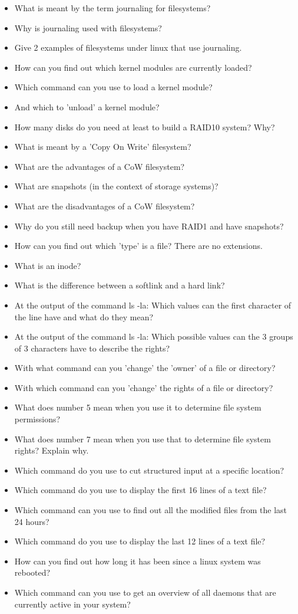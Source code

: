 \documentclass{article}
\begin{document}
\begin{itemize}
    \item What is meant by the term journaling for filesystems?
    \item Why is journaling used with filesystems?
    \item Give 2 examples of filesystems under linux that use journaling.
    \item How can you find out which kernel modules are currently loaded?
    \item Which command can you use to load a kernel module? 
    \item And which to 'unload' a kernel module?
    \item How many disks do you need at least to build a RAID10 system? Why?
    \item What is meant by a 'Copy On Write' filesystem?
    \item What are the advantages of a CoW filesystem?
    \item What are snapshots (in the context of storage systems)?
    \item What are the disadvantages of a CoW filesystem?
    \item Why do you still need backup when you have RAID1 and have snapshots?
    \item How can you find out which 'type' is a file? There are no extensions.
    \item What is an inode?
    \item What is the difference between a softlink and a hard link?
    \item At the output of the command ls -la: Which values can the first character of the line have and what do they mean?
    \item At the output of the command ls -la: Which possible values can the 3 groups of 3 characters have to describe the rights?
    \item With what command can you 'change' the 'owner' of a file or directory?
    \item With which command can you 'change' the rights of a file or directory?
    \item What does number 5 mean when you use it to determine file system permissions?
    \item What does number 7 mean when you use that to determine file system rights? Explain why.
    \item Which command do you use to cut structured input at a specific location?
    \item Which command do you use to display the first 16 lines of a text file?
    \item Which command can you use to find out all the modified files from the last 24 hours?
    \item Which command do you use to display the last 12 lines of a text file?
    \item How can you find out how long it has been since a linux system was rebooted?
    \item Which command can you use to get an overview of all daemons that are currently active in your system?
\end{itemize}
\end{document}
